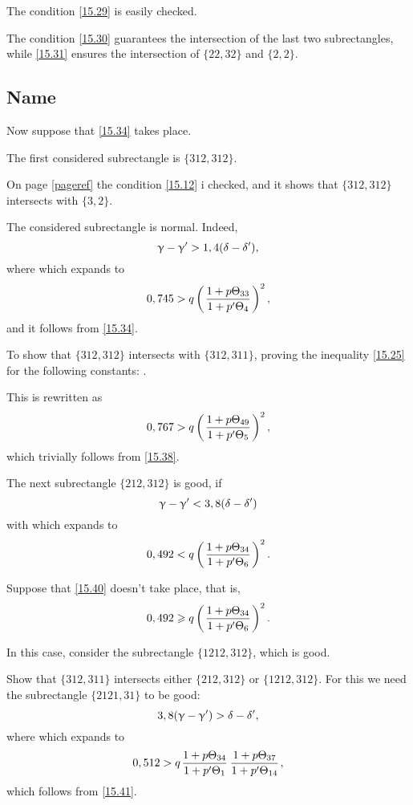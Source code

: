 The condition \ref{15.29} is easily checked.

The condition \ref{15.30} guarantees the intersection of the last two subrectangles,
while \ref{15.31} ensures the intersection of $\{22, 32\}$ and $\{2, 2\}$.

\subsection{Name}

Now suppose that \ref{15.34} takes place.

The first considered subrectangle is $\{312, 312\}$.

On page \ref{pageref} the condition \ref{15.12} i checked,
and it shows that $\{312, 312\}$ intersects with $\{3, 2\}$.

The considered subrectangle is normal. Indeed,
\begin{equation}\label{15.37}
	\upgamma - \upgamma' > 1,4 (\delta - \delta'),
\end{equation}
where
which expands to
\begin{equation}\label{15.38}
	0,745 > q \left( \mkern 2mu \dfrac{1 + {p} \Theta_{33}}{1 + {p'} \Theta_{4}} \mkern 2mu \right)^2,
\end{equation}
and it follows from \ref{15.34}.

To show that $\{312, 312\}$ intersects with $\{312, 311\}$,
proving the inequality \ref{15.25} for the following constants:
.

This is rewritten as
\begin{equation*}
	0,767 > q \left(\mkern 2mu \dfrac{1 + {p} \Theta_{49}}{1 + {p'} \Theta_{5}} \mkern 2mu\right)^2,
\end{equation*}
which trivially follows from \ref{15.38}.

The next subrectangle $\{212, 312\}$ is good, if
\begin{equation}\label{15.39}
	\upgamma - \upgamma' < 3,8 (\delta - \delta')
\end{equation}
with
which expands to
\begin{equation}\label{15.40}
	0,492 < q \left(\mkern 2mu \dfrac{1 + {p} \Theta_{34}}{1 + {p'} \Theta_{6}} \mkern 2mu\right)^2.
\end{equation}

Suppose that \ref{15.40} doesn't take place, that is,
\begin{equation}\label{15.41}
	0,492 \geqslant q \left(\mkern 2mu \dfrac{1 + {p} \Theta_{34}}{1 + {p'} \Theta_{6}} \mkern 2mu\right)^2.
\end{equation}

In this case, consider the subrectangle $\{1212, 312\}$, which is good.

Show that $\{312, 311\}$ intersects either $\{212, 312\}$ or $\{1212, 312\}$.
For this we need the subrectangle $\{2121, 31\}$ to be good:
\begin{equation}\label{15.43}
	3,8 (\upgamma - \upgamma') > \delta - \delta',
\end{equation}
where
which expands to
\begin{equation*}
	0,512 > q \up{34}{1} \up{37}{14},
\end{equation*}
which follows from \ref{15.41}.

